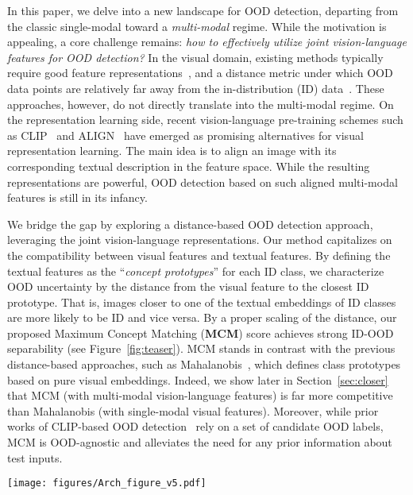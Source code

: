 \documentclass{article}
\begin{document}
In this paper, we delve into a new landscape for OOD detection, departing from the classic {single-modal} toward a \emph{multi-modal} regime. While the motivation is appealing, a core challenge remains: \textit{how to effectively utilize joint vision-language features for OOD detection?} In the visual domain, existing methods typically require good feature representations~\cite{2021ssd,tack2020csi}, and a distance metric under which OOD data points are relatively far away from the in-distribution (ID) data~\cite{lee2018simple,sun2022knn}. These approaches, however, do not directly translate into the multi-modal regime. On the representation learning side, recent vision-language pre-training schemes such as CLIP~\cite{radford2021learning} and ALIGN~\cite{jia2021scaling} have emerged as promising alternatives for visual representation learning. The main idea is to align an image with its corresponding textual description in the feature space. While the resulting representations are powerful, OOD detection based on such aligned multi-modal features is still in its infancy. 


We bridge the gap by exploring a distance-based OOD detection approach, leveraging the joint vision-language representations. Our method capitalizes on the compatibility between visual features and textual features. By defining the textual features as the ``\emph{concept prototypes}'' for each ID class, we characterize OOD uncertainty by the distance from the visual feature to the closest ID prototype. That is, images closer to one of the textual embeddings of ID classes are more likely to be ID and vice versa. By a proper scaling of the distance, our proposed Maximum Concept Matching (\textbf{MCM}) score achieves strong ID-OOD separability (see Figure~\ref{fig:teaser}).
MCM
stands in contrast with the previous distance-based approaches, such as Mahalanobis~\cite{lee2018simple}, which defines class prototypes based on pure visual embeddings. Indeed, we show later in Section~\ref{sec:closer} that MCM (with multi-modal vision-language features) is far more competitive than Mahalanobis (with single-modal visual features). Moreover, while prior works of CLIP-based OOD detection~\cite{esmaeilpour2022zero,fort2021exploring} rely on a set of candidate OOD labels, MCM is OOD-agnostic and alleviates the need for any prior information about test inputs.

\begin{figure*}[t]
  \centering
    \texttt{[image: figures/Arch\_figure\_v5.pdf]}
    
\caption{
Overview of the proposed zero-shot OOD detection framework.
The ID classification task is defined by a set of class labels $\mathcal{Y}_\text{in}$. The goal of OOD detection is to detect samples that do not belong to $\mathcal{Y}_\text{in}$. We view the textual embeddings of ID classes (wrapped by text templates) as concept prototypes. The OOD uncertainty of an input image can be characterized by the distance from visual features to the closest ID prototype. By properly scaling the distance, the MCM score achieves strong ID-OOD separability. See Section~\ref{sec:method} for details.}
\vspace{-3mm}
\label{fig:teaser}
\end{figure*}
\end{document}
